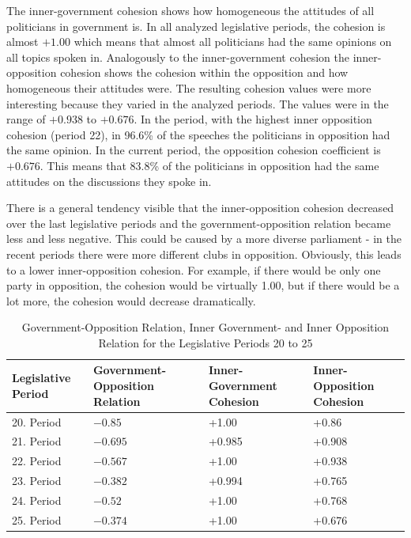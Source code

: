 The inner-government cohesion shows how homogeneous the attitudes of all politicians in government is. In all analyzed legislative periods, the cohesion is almost $+1.00$ which means that almost all politicians had the same opinions on all topics spoken in. Analogously to the inner-government cohesion the inner-opposition cohesion shows the cohesion within the opposition and how homogeneous their attitudes were. The resulting cohesion values were more interesting because they varied in the analyzed periods. The values were in the range of $+0.938$ to $+0.676$. In the period, with the highest inner opposition cohesion (period 22), in 96.6\% of the speeches the politicians in opposition had the same opinion. In the current period, the opposition cohesion coefficient is $+0.676$. This means that 83.8\% of the politicians in opposition had the same attitudes on the discussions they spoke in.

There is a general tendency visible that the inner-opposition cohesion decreased over the last legislative periods and the government-opposition relation became less and less negative. This could be caused by a more diverse parliament - in the recent periods there were more different clubs in opposition. Obviously, this leads to a lower inner-opposition cohesion. For example, if there would be only one party in opposition, the cohesion would be virtually 1.00, but if there would be a lot more, the cohesion would decrease dramatically.

\begin{table}

\centering
\bgroup
\def\arraystretch{1.2}
\begin{tabular}{| p{2cm} | p{3cm} | p{3cm} | p{3cm} |}
\hline
  Legislative Period & Government-Opposition Relation & Inner-Government Cohesion & Inner-Opposition Cohesion \\
\hline
\hline
  20. Period & $-0.85$ & +1.00 & +0.86 \\
\hline
  21. Period & $-0.695$ & +0.985 & +0.908 \\
\hline
  22. Period & $-0.567$ & +1.00 & +0.938 \\
\hline
  23. Period & $-0.382$ & +0.994 & +0.765\\
\hline
  24. Period & $-0.52$ & +1.00 & +0.768\\
\hline
  25. Period & $-0.374$ & +1.00 & +0.676\\
\hline

\end{tabular}
\egroup
\caption{Government-Opposition Relation, Inner Government- and Inner Opposition Relation for the Legislative Periods 20 to 25}
\label{table:gov_opp_relation}
\end{table}

